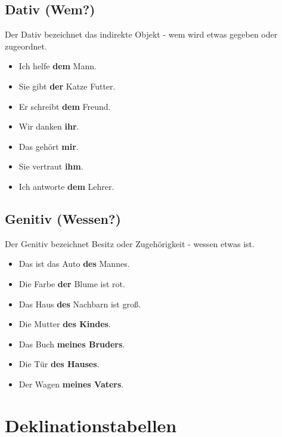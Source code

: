 \subsection{Dativ (Wem?)}
\begin{tcolorbox}[title=Funktion]
Der Dativ bezeichnet das indirekte Objekt - wem wird etwas gegeben oder zugeordnet.
\end{tcolorbox}

\begin{itemize}
    \item Ich helfe \textbf{dem} Mann.
    \item Sie gibt \textbf{der} Katze Futter.
    \item Er schreibt \textbf{dem} Freund.
    \item Wir danken \textbf{ihr}.
    \item Das gehört \textbf{mir}.
    \item Sie vertraut \textbf{ihm}.
    \item Ich antworte \textbf{dem} Lehrer.
\end{itemize}

\subsection{Genitiv (Wessen?)}
\begin{tcolorbox}[title=Funktion]
Der Genitiv bezeichnet Besitz oder Zugehörigkeit - wessen etwas ist.
\end{tcolorbox}

\begin{itemize}
    \item Das ist das Auto \textbf{des} Mannes.
    \item Die Farbe \textbf{der} Blume ist rot.
    \item Das Haus \textbf{des} Nachbarn ist groß.
    \item Die Mutter \textbf{des Kindes}.
    \item Das Buch \textbf{meines Bruders}.
    \item Die Tür \textbf{des Hauses}.
    \item Der Wagen \textbf{meines Vaters}.
\end{itemize}

\section{Deklinationstabellen}
\label{sec:Deklinationstabellen}

